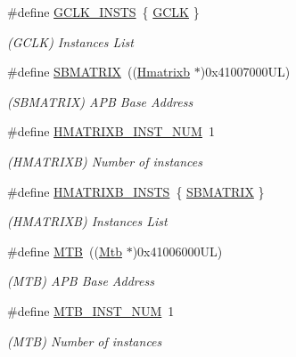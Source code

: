 \begin{DoxyCompactItemize}
\#define \mbox{\hyperlink{group___s_a_m_d21_g15_l__base_gaa628d67bafdc0077c685b79f3344decb}{G\+C\+L\+K\+\_\+\+I\+N\+S\+TS}}~\{ \mbox{\hyperlink{group___s_a_m_d21_j18_a__base_ga23f9186cfd6ee5e60c8485315183271f}{G\+C\+LK}} \}
\begin{DoxyCompactList}\small\item\em (G\+C\+LK) Instances List \end{DoxyCompactList}\item 
\#define \mbox{\hyperlink{group___s_a_m_d21_g15_l__base_ga9036739dd33ab6ada3129dcd7789af2b}{S\+B\+M\+A\+T\+R\+IX}}~((\mbox{\hyperlink{struct_hmatrixb}{Hmatrixb}} $\ast$)0x41007000\+U\+L)
\begin{DoxyCompactList}\small\item\em (S\+B\+M\+A\+T\+R\+IX) A\+PB Base Address \end{DoxyCompactList}\item 
\#define \mbox{\hyperlink{group___s_a_m_d21_g15_l__base_gacdd3c27438c6bf468cf3e4cc2cbe2798}{H\+M\+A\+T\+R\+I\+X\+B\+\_\+\+I\+N\+S\+T\+\_\+\+N\+UM}}~1
\begin{DoxyCompactList}\small\item\em (H\+M\+A\+T\+R\+I\+XB) Number of instances \end{DoxyCompactList}\item 
\#define \mbox{\hyperlink{group___s_a_m_d21_g15_l__base_ga3f70e157160178c48c7f7c1aafb3151d}{H\+M\+A\+T\+R\+I\+X\+B\+\_\+\+I\+N\+S\+TS}}~\{ \mbox{\hyperlink{group___s_a_m_d21_j18_a__base_ga9036739dd33ab6ada3129dcd7789af2b}{S\+B\+M\+A\+T\+R\+IX}} \}
\begin{DoxyCompactList}\small\item\em (H\+M\+A\+T\+R\+I\+XB) Instances List \end{DoxyCompactList}\item 
\#define \mbox{\hyperlink{group___s_a_m_d21_g15_l__base_ga09636f7f0071f50666d5747d44c6b94e}{M\+TB}}~((\mbox{\hyperlink{struct_mtb}{Mtb}}      $\ast$)0x41006000\+U\+L)
\begin{DoxyCompactList}\small\item\em (M\+TB) A\+PB Base Address \end{DoxyCompactList}\item 
\#define \mbox{\hyperlink{group___s_a_m_d21_g15_l__base_ga9ab4175347e0c210cf409140367a4066}{M\+T\+B\+\_\+\+I\+N\+S\+T\+\_\+\+N\+UM}}~1
\begin{DoxyCompactList}\small\item\em (M\+TB) Number of instances \end{DoxyCompactList}\item 

\end{DoxyCompactItemize}
